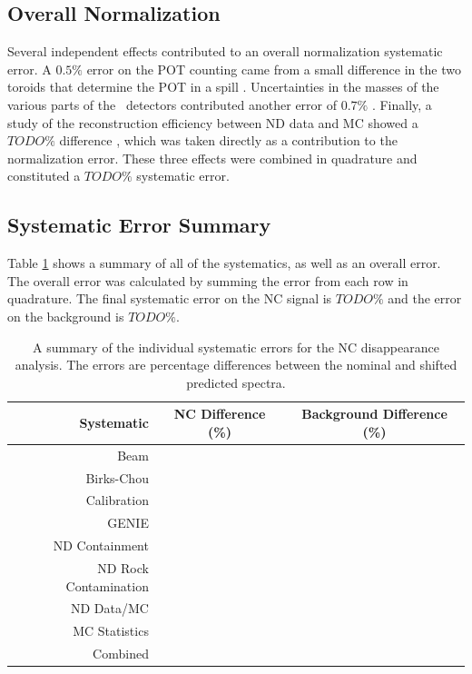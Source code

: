 \subsection{Overall Normalization}

Several independent effects contributed to an overall normalization systematic error. A $0.5\%$ error on the POT counting came from a small difference in the two toroids that determine the POT in a spill \cite{ref:TNBeam}. Uncertainties in the masses of the various parts of the \nova~detectors contributed another error of $0.7\%$ \cite{ref:MassError}. Finally, a study of the reconstruction efficiency between ND data and MC showed a $TODO\%$ difference \cite{ref:NDDataMCRecoEff}, which was taken directly as a contribution to the normalization error. These three effects were combined in quadrature and constituted a $TODO\%$ systematic error.

\subsection{Systematic Error Summary}

Table \ref{tab:SystSummary} shows a summary of all of the systematics, as well as an overall error. The overall error was calculated by summing the error from each row in quadrature. The final systematic error on the NC signal is $TODO\%$ and the error on the background is $TODO\%$.
\begin{table}[h]
  \begin{center}
    \caption[Systematic Error Summary]{A summary of the individual systematic errors for the NC disappearance analysis. The errors are percentage differences between the nominal and shifted predicted spectra.}
    \label{tab:SystSummary}
    \begin{tabular}{r c c}
      \hline\hline
      Systematic & NC Difference (\%) & Background Difference (\%) \\
      \hline
      Beam & & \\
      Birks-Chou & & \\
      Calibration & & \\
      GENIE & & \\
      ND Containment & & \\
      ND Rock Contamination & & \\
      ND Data/MC & & \\
      MC Statistics & & \\
      \hline
      Combined & & \\
      \hline
    \end{tabular}
  \end{center}
\end{table}

